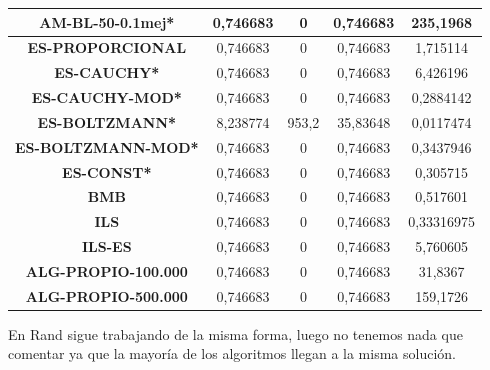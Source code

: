 \documentclass[12pt, spanish]{article}
\begin{document}
\begin{table}[H]
\begin{tabular}{|c|c|c|c|c|}
\textbf{AM-BL-50-0.1mej*}   & 0,746683                  & 0                           & 0,746683               & 235,1968   \\ \hline
\textbf{ES-PROPORCIONAL}    & 0,746683                  & 0                           & 0,746683               & 1,715114   \\ \hline
\textbf{ES-CAUCHY*}         & 0,746683                  & 0                           & 0,746683               & 6,426196   \\ \hline
\textbf{ES-CAUCHY-MOD*}     & 0,746683                  & 0                           & 0,746683               & 0,2884142  \\ \hline
\textbf{ES-BOLTZMANN*}      & 8,238774                  & 953,2                       & 35,83648               & 0,0117474  \\ \hline
\textbf{ES-BOLTZMANN-MOD*}  & 0,746683                  & 0                           & 0,746683               & 0,3437946  \\ \hline
\textbf{ES-CONST*}          & 0,746683                  & 0                           & 0,746683               & 0,305715   \\ \hline
\textbf{BMB}                & 0,746683                  & 0                           & 0,746683               & 0,517601   \\ \hline
\textbf{ILS}                & 0,746683                  & 0                           & 0,746683               & 0,33316975 \\ \hline
\textbf{ILS-ES}             & 0,746683                  & 0                           & 0,746683               & 5,760605   \\ \hline
\textbf{ALG-PROPIO-100.000} & 0,746683                  & 0                           & 0,746683               & 31,8367    \\ \hline
\textbf{ALG-PROPIO-500.000} & 0,746683                  & 0                           & 0,746683               & 159,1726   \\ \hline
\end{tabular}
\end{table}


En Rand sigue trabajando de la misma forma, luego no tenemos nada que comentar ya que la mayoría de los algoritmos llegan a la misma solución.
\end{document}
